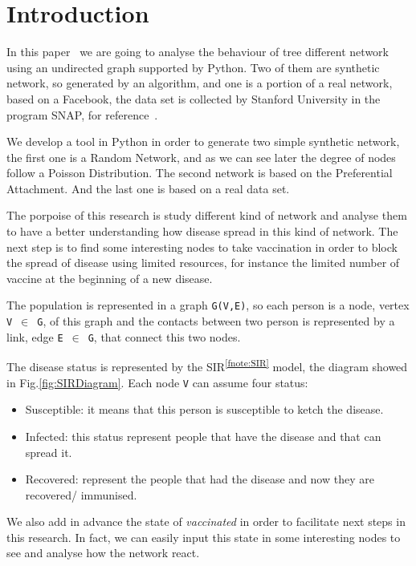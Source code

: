 
\section{Introduction}
    In this paper~\cite{thisPaper} we are going to analyse the behaviour of tree different network using an undirected graph supported by Python.
    Two of them are synthetic network, so generated by an algorithm, and one is a portion of a real network, based on a Facebook, the data set is collected by Stanford University in the program SNAP, for reference~\cite{McAuley:2012:LDS:2999134.2999195}.
  
    We develop a tool in Python in order to generate two simple synthetic network, the first one is a Random Network, and as we can see later the degree of nodes follow a Poisson Distribution.
    The second network is based on the Preferential Attachment.
    And the last one is based on a real data set.
  
    The porpoise of this research is study different kind of network and analyse them to have a better understanding how disease spread in this kind of network.
    The next step is to find some interesting nodes to take vaccination in order to block the spread of disease using limited resources, for instance the limited number of vaccine at the beginning of a new disease.
  
    The population is represented in a graph \verb|G(V,E)|, so each person is a node, vertex \verb|V|~$\in$~\verb|G|, of this graph and the contacts between two person is represented by a link, edge \verb|E|~$\in$~\verb|G|, that connect this two nodes.
  
    The disease status is represented by the SIR\textsuperscript{\ref{fnote:SIR}} model, the diagram showed in Fig.\ref{fig:SIRDiagram}.
    Each node \verb|V| can assume four status:
    \begin{itemize}
      \item Susceptible: it means that this person is susceptible to ketch the disease.
      \item Infected: this status represent people that have the disease and that can spread it.
      \item Recovered: represent the people that had the disease and now they are recovered/ immunised.
    \end{itemize}

    We also add in advance the state of \textit{vaccinated} in order to facilitate next steps in this research.
    In fact, we can easily input this state in some interesting nodes to see and analyse how the network react.

